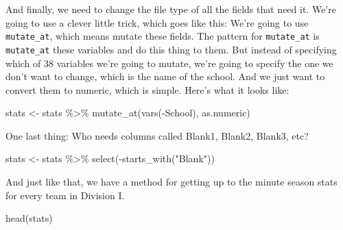 \documentclass[
]{book}
\newenvironment{Shaded}{\begin{snugshade}}{\end{snugshade}}
\newcommand{\FunctionTok}[1]{\textcolor[rgb]{0.00,0.00,0.00}{#1}}
\newcommand{\NormalTok}[1]{#1}
\newcommand{\OtherTok}[1]{\textcolor[rgb]{0.56,0.35,0.01}{#1}}
\newcommand{\SpecialCharTok}[1]{\textcolor[rgb]{0.00,0.00,0.00}{#1}}
\newcommand{\StringTok}[1]{\textcolor[rgb]{0.31,0.60,0.02}{#1}}
\begin{document}
And finally, we need to change the file type of all the fields that need it. We're going to use a clever little trick, which goes like this: We're going to use \texttt{mutate\_at}, which means mutate these fields. The pattern for \texttt{mutate\_at} is \texttt{mutate\_at} these variables and do this thing to them. But instead of specifying which of 38 variables we're going to mutate, we're going to specify the one we don't want to change, which is the name of the school. And we just want to convert them to numeric, which is simple. Here's what it looks like:

\begin{Shaded}
\begin{Highlighting}[]
\NormalTok{stats }\OtherTok{\textless{}{-}}\NormalTok{ stats }\SpecialCharTok{\%\textgreater{}\%} \FunctionTok{mutate\_at}\NormalTok{(}\FunctionTok{vars}\NormalTok{(}\SpecialCharTok{{-}}\NormalTok{School), as.numeric)}
\end{Highlighting}
\end{Shaded}

One last thing: Who needs columns called Blank1, Blank2, Blank3, etc?

\begin{Shaded}
\begin{Highlighting}[]
\NormalTok{stats }\OtherTok{\textless{}{-}}\NormalTok{ stats }\SpecialCharTok{\%\textgreater{}\%} \FunctionTok{select}\NormalTok{(}\SpecialCharTok{{-}}\FunctionTok{starts\_with}\NormalTok{(}\StringTok{"Blank"}\NormalTok{))}
\end{Highlighting}
\end{Shaded}

And just like that, we have a method for getting up to the minute season stats for every team in Division I.

\begin{Shaded}
\begin{Highlighting}[]
\FunctionTok{head}\NormalTok{(stats)}
\end{Highlighting}
\end{Shaded}
\end{document}
